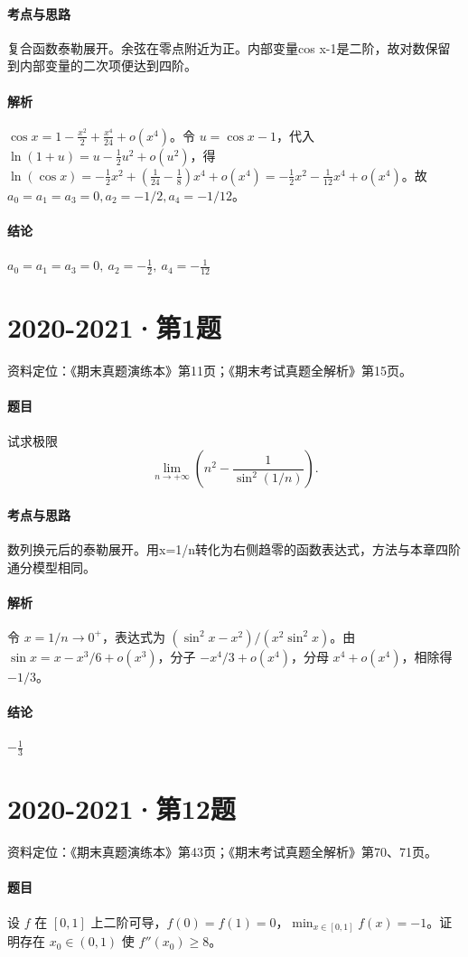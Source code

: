 \documentclass[UTF8,fontset=fandol,12pt,oneside,openany]{ctexrep}
\theoremstyle{definition}
\begin{document}
\paragraph{考点与思路}
复合函数泰勒展开。余弦在零点附近为正。内部变量cos x-1是二阶，故对数保留到内部变量的二次项便达到四阶。
\paragraph{解析}
$\cos x=1-\frac{x^2}2+\frac{x^4}{24}+o(x^4)$。令 $u=\cos x-1$，代入 $\ln(1+u)=u-\frac12u^2+o(u^2)$，得 $\ln(\cos x)=-\frac12x^2+(\frac1{24}-\frac18)x^4+o(x^4)=-\frac12x^2-\frac1{12}x^4+o(x^4)$。故 $a_0=a_1=a_3=0,a_2=-1/2,a_4=-1/12$。
\paragraph{结论}
$a_0=a_1=a_3=0,\ a_2=-\frac12,\ a_4=-\frac1{12}$

\par\addvspace{18pt}\noindent\begin{minipage}{\linewidth}
\section{2020-2021·第1题}
\label{exam:08:q11}
资料定位：《期末真题演练本》第11页；《期末考试真题全解析》第15页。
\paragraph{题目}
试求极限 \[\lim_{n\to+\infty}\left(n^2-\frac1{\sin^2(1/n)}\right).\]
\end{minipage}\par
\paragraph{考点与思路}
数列换元后的泰勒展开。用x=1/n转化为右侧趋零的函数表达式，方法与本章四阶通分模型相同。
\paragraph{解析}
令 $x=1/n\to0^+$，表达式为 $(\sin^2x-x^2)/(x^2\sin^2x)$。由 $\sin x=x-x^3/6+o(x^3)$，分子 $-x^4/3+o(x^4)$，分母 $x^4+o(x^4)$，相除得 $-1/3$。
\paragraph{结论}
$-\frac13$

\par\addvspace{18pt}\noindent\begin{minipage}{\linewidth}
\section{2020-2021·第12题}
\label{exam:08:q12}
资料定位：《期末真题演练本》第43页；《期末考试真题全解析》第70、71页。
\paragraph{题目}
设 $f$ 在 $[0,1]$ 上二阶可导，$f(0)=f(1)=0$，$\min_{x\in[0,1]}f(x)=-1$。证明存在 $x_0\in(0,1)$ 使 $f''(x_0)\ge8$。
\end{minipage}\par
\end{document}

